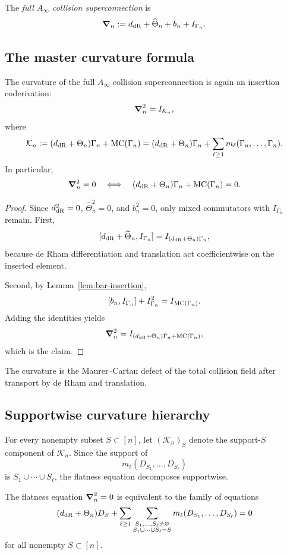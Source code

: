 \begin{definition}\label{def:superconnection}
The \emph{full $A_\infty$ collision superconnection} is
\[
 \boldsymbol{\nabla}_n := d_{\mathrm{dR}} + \widehat\Theta_n + b_n + I_{\Gamma_n}.
\]
\end{definition}

\subsection{The master curvature formula}

\begin{theorem}\label{thm:master-curvature}
The curvature of the full $A_\infty$ collision superconnection is again an insertion coderivation:
\[
 \boldsymbol{\nabla}_n^2 = I_{\mathcal K_n},
\]
where
\[
 \mathcal K_n := (d_{\mathrm{dR}}+\Theta_n)\Gamma_n + \mathrm{MC}(\Gamma_n)
 = (d_{\mathrm{dR}}+\Theta_n)\Gamma_n + \sum_{\ell\ge 1} m_\ell(\Gamma_n,\dots,\Gamma_n).
\]
In particular,
\[
 \boldsymbol{\nabla}_n^2=0
 \quad\Longleftrightarrow\quad
 (d_{\mathrm{dR}}+\Theta_n)\Gamma_n+\mathrm{MC}(\Gamma_n)=0.
\]
\end{theorem}

\begin{proof}
Since $d_{\mathrm{dR}}^2=0$, $\widehat\Theta_n^2=0$, and $b_n^2=0$, only mixed commutators with $I_{\Gamma_n}$ remain. First,
\[
 [d_{\mathrm{dR}}+\widehat\Theta_n,I_{\Gamma_n}] = I_{(d_{\mathrm{dR}}+\Theta_n)\Gamma_n},
\]
because de Rham differentiation and translation act coefficientwise on the inserted element.

Second, by Lemma~\ref{lem:bar-insertion},
\[
 [b_n,I_{\Gamma_n}] + I_{\Gamma_n}^2 = I_{\mathrm{MC}(\Gamma_n)}.
\]
Adding the identities yields
\[
 \boldsymbol{\nabla}_n^2 = I_{(d_{\mathrm{dR}}+\Theta_n)\Gamma_n+\mathrm{MC}(\Gamma_n)},
\]
which is the claim.
\end{proof}

The curvature is the Maurer--Cartan defect of the total collision field after transport by de Rham and translation.

\subsection{Supportwise curvature hierarchy}
For every nonempty subset $S\subset[n]$, let $(\mathcal K_n)_S$ denote the support-$S$ component of $\mathcal K_n$. Since the support of
\[
 m_\ell(D_{S_1},\dots,D_{S_\ell})
\]
is $S_1\cup\cdots\cup S_\ell$, the flatness equation decomposes supportwise.

\begin{theorem}\label{thm:support-hierarchy}
The flatness equation $\boldsymbol{\nabla}_n^2=0$ is equivalent to the family of equations
\[
 (d_{\mathrm{dR}}+\Theta_n)D_S +
 \sum_{\ell\ge 1}
 \sum_{\substack{S_1,\dots,S_\ell\neq\varnothing \\
 S_1\cup\cdots\cup S_\ell = S}}
 m_\ell(D_{S_1},\dots,D_{S_\ell})
 =0
\]
for all nonempty $S\subset[n]$.
\end{theorem}

